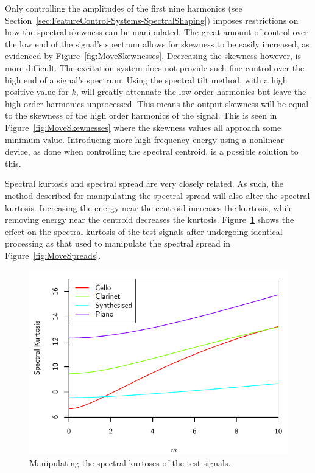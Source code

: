 			Only controlling the amplitudes of the first nine harmonics (see
			Section~\ref{sec:FeatureControl-Systems-SpectralShaping}) imposes restrictions on how the
			spectral skewness can be manipulated. The great amount of control over the low end of the signal's
			spectrum allows for skewness to be easily increased, as evidenced by
			Figure~\ref{fig:MoveSkewnesses}.  Decreasing the skewness however, is more difficult. The
			excitation system does not provide such fine control over the high end of a signal's spectrum.
			Using the spectral tilt method, with a high positive value for $k$, will greatly attenuate the low
			order harmonics but leave the high order harmonics unprocessed. This means the output skewness will
			be equal to the skewness of the high order harmonics of the signal. This is seen in
			Figure~\ref{fig:MoveSkewnesses} where the skewness values all approach some minimum value.
			Introducing more high frequency energy using a nonlinear device, as done when controlling the
			spectral centroid, is a possible solution to this.

			Spectral kurtosis and spectral spread are very closely related. As such, the method described for
			manipulating the spectral spread will also alter the spectral kurtosis. Increasing the energy near
			the centroid increases the kurtosis, while removing energy near the centroid decreases the
			kurtosis.  Figure~\ref{fig:MoveKurtoses} shows the effect on the spectral kurtosis of the test
			signals after undergoing identical processing as that used to manipulate the spectral spread in
			Figure~\ref{fig:MoveSpreads}.
			
			\begin{figure}[h!]
				\centering
				\includegraphics{chapter6/Images/MoveKurtoses.pdf}
				\caption{Manipulating the spectral kurtoses of the test signals.}
				\label{fig:MoveKurtoses}
			\end{figure}

